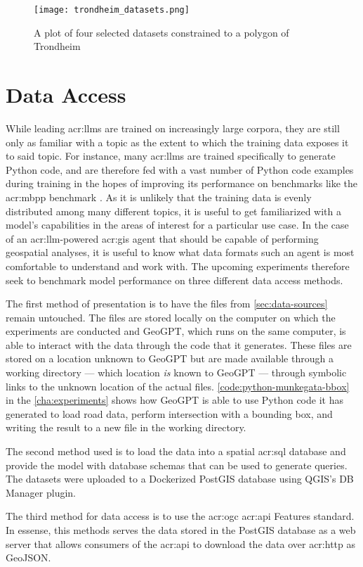 \begin{figure}
    \centering
    \texttt{[image: trondheim\_datasets.png]}
    \label{fig:datasets-trondheim}
    \caption{A plot of four selected datasets constrained to a polygon of Trondheim}
\end{figure}

\section{Data Access}
\label{sec:data-access}

While leading \glspl{acr:llm} are trained on increasingly large corpora, they are still only as familiar with a topic as the extent to which the training data exposes it to said topic. For instance, many \glspl{acr:llm} are trained specifically to generate Python code, and are therefore fed with a vast number of Python code examples during training in the hopes of improving its performance on benchmarks like the \gls{acr:mbpp} benchmark \citep{austinProgramSynthesisLarge2021}. As it is unlikely that the training data is evenly distributed among many different topics, it is useful to get familiarized with a model's capabilities in the areas of interest for a particular use case. In the case of an \acrshort{acr:llm}-powered \acrshort{acr:gis} agent that should be capable of performing geospatial analyses, it is useful to know what data formats such an agent is most comfortable to understand and work with. The upcoming experiments therefore seek to benchmark model performance on three different data access methods.

The first method of presentation is to have the files from \autoref{sec:data-sources} remain untouched. The files are stored locally on the computer on which the experiments are conducted and GeoGPT, which runs on the same computer, is able to interact with the data through the code that it generates. These files are stored on a location unknown to GeoGPT but are made available through a working directory --- which location \textit{is} known to GeoGPT --- through symbolic links to the unknown location of the actual files. \autoref{code:python-munkegata-bbox} in the \autoref{cha:experiments} shows how GeoGPT is able to use Python code it has generated to load road data, perform intersection with a bounding box, and writing the result to a new file in the working directory.

The second method used is to load the data into a spatial \acrshort{acr:sql} database and provide the model with database schemas that can be used to generate queries. The datasets were uploaded to a Dockerized PostGIS database using QGIS's DB Manager plugin.

The third method for data access is to use the \acrshort{acr:ogc} \acrshort{acr:api} Features standard. In essense, this methods serves the data stored in the PostGIS database as a web server that allows consumers of the \acrshort{acr:api} to download the data over \acrshort{acr:http} as GeoJSON.

\glsresetall
